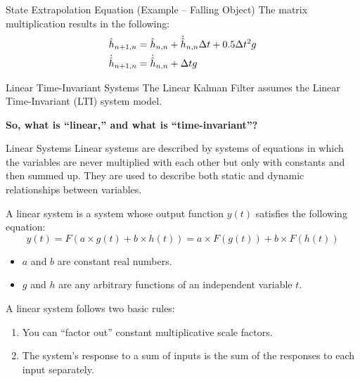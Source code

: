 \begin{frame}{State Extrapolation Equation (Example – Falling Object)}
The matrix multiplication results in the following:
\begin{align}
\hat{h}_{n+1,n} &= \hat{h}_{n,n} + \dot{\hat{h}}_{n,n}\Delta t + 0.5\Delta t^2g \notag \\
\dot{\hat{h}}_{n+1,n} &= \dot{\hat{h}}_{n,n} + \Delta tg \notag
\end{align}

\end{frame}
\begin{frame}{Linear Time-Invariant Systems}
The Linear Kalman Filter assumes the Linear Time-Invariant (LTI) system model.

\textbf{So, what is “linear,” and what is “time-invariant”?}

\begin{block}{Linear Systems}
Linear systems are described by systems of equations in which the variables are never multiplied with each other but only with constants and then summed up. They are used to describe both static and dynamic relationships between variables.

A linear system is a system whose output function \(y(t)\) satisfies the following equation:
\[y(t) = F (a \times g(t) + b \times h(t)) = a \times F(g(t)) + b \times F(h(t))\]
\begin{itemize}
    \item \(a\) and \(b\) are constant real numbers.
    \item \(g\) and \(h\) are any arbitrary functions of an independent variable \(t\).
\end{itemize}

A linear system follows two basic rules:
\begin{enumerate}
    \item You can “factor out” constant multiplicative scale factors.
    \item The system’s response to a sum of inputs is the sum of the responses to each input separately.
\end{enumerate}
\end{block}
\end{frame}

